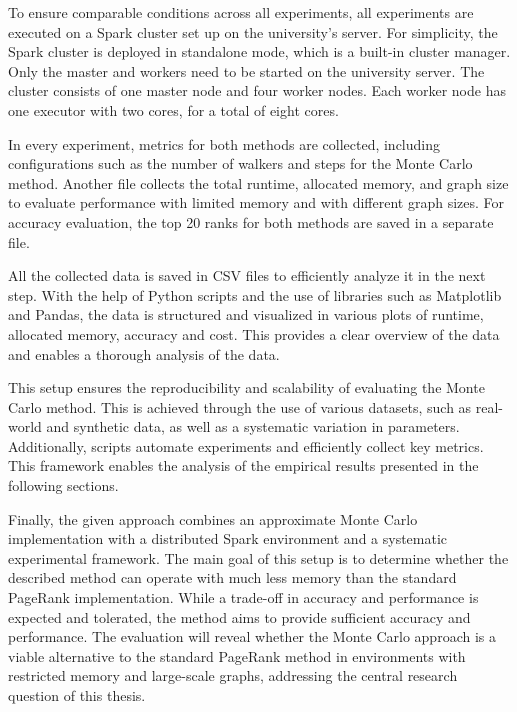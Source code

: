 To ensure comparable conditions across all experiments, all experiments are executed on a Spark cluster set up on the university's server. For simplicity, the Spark cluster is deployed in standalone mode, which is a built-in cluster manager. Only the master and workers need to be started on the university server. The cluster consists of one master node and four worker nodes. Each worker node has one executor with two cores, for a total of eight cores. \par


In every experiment, metrics for both methods are collected, including configurations such as the number of walkers and steps for the Monte Carlo method. Another file collects the total runtime, allocated memory, and graph size to evaluate performance with limited memory and with different graph sizes. For accuracy evaluation, the top 20 ranks for both methods are saved in a separate file. \par
All the collected data is saved in CSV files to efficiently analyze it in the next step. With the help of Python scripts and the use of libraries such as Matplotlib and Pandas, the data is structured and visualized in various plots of runtime, allocated memory, accuracy and cost. This provides a clear overview of the data and enables a thorough analysis of the data. \par
This setup ensures the reproducibility and scalability of evaluating the Monte Carlo method. This is achieved through the use of various datasets, such as real-world and synthetic data, as well as a systematic variation in parameters. Additionally, scripts automate experiments and efficiently collect key metrics. This framework enables the analysis of the empirical results presented in the following sections. \par

Finally, the given approach combines an approximate Monte Carlo implementation with a distributed Spark environment and a systematic experimental framework. The main goal of this setup is to determine whether the described method can operate with much less memory than the standard PageRank implementation. While a trade-off in accuracy and performance is expected and tolerated, the method aims to provide sufficient accuracy and performance. The evaluation will reveal whether the Monte Carlo approach is a viable alternative to the standard PageRank method in environments with restricted memory and large-scale graphs, addressing the central research question of this thesis.


